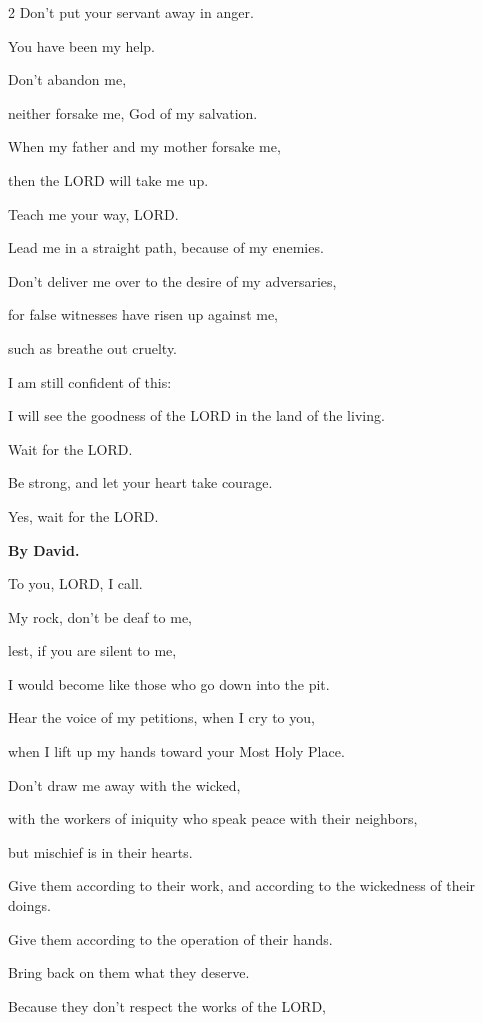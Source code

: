 \begin{multicols}{2}
	Don’t put your servant away in anger.
	
	You have been my help.
	
	Don’t abandon me,
	
	neither forsake me, God of my salvation.
	
	
	\myverse{}When my father and my mother forsake me,
	
	then the LORD will take me up.
	
	
	\myverse{}Teach me your way, LORD.
	
	Lead me in a straight path, because of my enemies.
	
	
	\myverse{}Don’t deliver me over to the desire of my adversaries,
	
	for false witnesses have risen up against me,
	
	such as breathe out cruelty.
	
	
	\myverse{}I am still confident of this:
	
	I will see the goodness of the LORD in the land of the living.
	
	
	\myverse{}Wait for the LORD.
	
	Be strong, and let your heart take courage.
	
	Yes, wait for the LORD.
	
	
	\mychapter{}\textbf{By David.}
	
	\quad \myverse*{}To you, LORD, I call.
	
	My rock, don’t be deaf to me,
	
	lest, if you are silent to me,
	
	I would become like those who go down into the pit.
	
	
	\myverse{}Hear the voice of my petitions, when I cry to you,
	
	when I lift up my hands toward your Most Holy Place.
	
	
	\myverse{}Don’t draw me away with the wicked,
	
	with the workers of iniquity who speak peace with their neighbors,
	
	but mischief is in their hearts.
	
	
	\myverse{}Give them according to their work, and according to the wickedness
	of their doings.
	
	Give them according to the operation of their hands.
	
	Bring back on them what they deserve.
	
	
	\myverse{}Because they don’t respect the works of the LORD,
	

\end{multicols}
